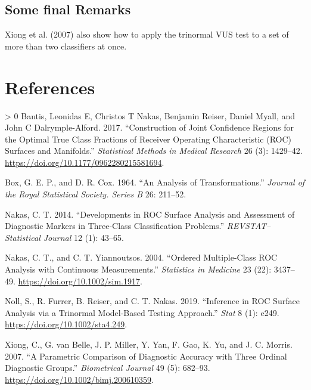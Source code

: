 \documentclass[
]{article}
\newlength{\cslhangindent}
\newenvironment{CSLReferences}[3] %
 {%
  \setlength{\parindent}{0pt}
  \ifodd #1 \everypar{\setlength{\hangindent}{\cslhangindent}}\ignorespaces\fi
  \ifnum #2 > 0
  \setlength{\parskip}{#2\baselineskip}
  \fi
 }%
 {}
\begin{document}
\hypertarget{some-final-remarks}{%
\subsection{Some final Remarks}\label{some-final-remarks}}

Xiong et al. (2007) also show how to apply the trinormal VUS test to a
set of more than two classifiers at once.

\hypertarget{references}{%
\section*{References}\label{references}}

\hypertarget{refs}{}
\begin{CSLReferences}{1}{0}
\leavevmode\hypertarget{ref-bantis2017}{}%
Bantis, Leonidas E, Christos T Nakas, Benjamin Reiser, Daniel Myall, and
John C Dalrymple-Alford. 2017. {``Construction of Joint Confidence
Regions for the Optimal True Class Fractions of Receiver Operating
Characteristic (ROC) Surfaces and Manifolds.''} \emph{Statistical
Methods in Medical Research} 26 (3): 1429--42.
\url{https://doi.org/10.1177/0962280215581694}.

\leavevmode\hypertarget{ref-box1964}{}%
Box, G. E. P., and D. R. Cox. 1964. {``An Analysis of
Transformations.''} \emph{Journal of the Royal Statistical Society.
Series B} 26: 211--52.

\leavevmode\hypertarget{ref-nakas2014}{}%
Nakas, C. T. 2014. {``Developments in {ROC} Surface Analysis and
Assessment of Diagnostic Markers in Three-Class Classification
Problems.''} \emph{REVSTAT--Statistical Journal} 12 (1): 43--65.

\leavevmode\hypertarget{ref-nakas2004}{}%
Nakas, C. T., and C. T. Yiannoutsos. 2004. {``Ordered Multiple-Class
{ROC} Analysis with Continuous Measurements.''} \emph{Statistics in
Medicine} 23 (22): 3437--49. \url{https://doi.org/10.1002/sim.1917}.

\leavevmode\hypertarget{ref-noll2019}{}%
Noll, S., R. Furrer, B. Reiser, and C. T. Nakas. 2019. {``Inference in
{ROC} Surface Analysis via a Trinormal Model-Based Testing Approach.''}
\emph{Stat} 8 (1): e249. \url{https://doi.org/10.1002/sta4.249}.

\leavevmode\hypertarget{ref-xiong2007}{}%
Xiong, C., G. van Belle, J. P. Miller, Y. Yan, F. Gao, K. Yu, and J. C.
Morris. 2007. {``A Parametric Comparison of Diagnostic Accuracy with
Three Ordinal Diagnostic Groups.''} \emph{Biometrical Journal} 49 (5):
682--93. \url{https://doi.org/10.1002/bimj.200610359}.

\end{CSLReferences}
\end{document}
